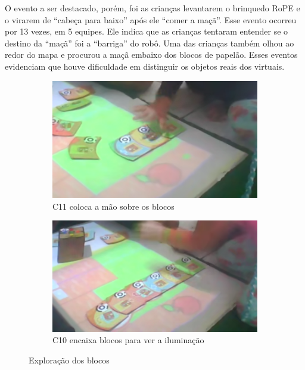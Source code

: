 O evento a ser destacado, porém, foi as crianças levantarem o brinquedo RoPE e o virarem de “cabeça para baixo” após ele “comer a maçã”. Esse evento ocorreu por 13 vezes, em 5 equipes. Ele indica que as crianças tentaram entender se o destino da “maçã” foi a “barriga” do robô. Uma das crianças também olhou ao redor do mapa e procurou a maçã embaixo dos blocos de papelão. Esses eventos evidenciam que houve dificuldade em distinguir os objetos reais dos virtuais. 

\begin{figure}[!htbp]
    \centering
    \begin{subfigure}{.5\textwidth}
        \centering
        \includegraphics[width=.9\linewidth,fbox]{figs/percepcao_ra/mao_sobre_blocos.png}
        \caption{C11 coloca a mão sobre os blocos}
        \label{fig:mao_sobre_blocos}
    \end{subfigure}%
    \begin{subfigure}{.5\textwidth}
        \centering
        \includegraphics[width=.9\linewidth,fbox]{figs/percepcao_ra/sequencia_blocos.png}
        \caption{C10 encaixa blocos para ver a iluminação}
        \label{fig:sequencia_blocos}
    \end{subfigure}
    \caption{Exploração dos blocos}
    \label{fig:percepcoes_ra}
\end{figure}

